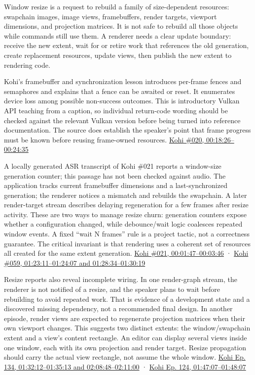 \hypertarget{06-engine-ii-ch041-resize-frames-in-flight-and-device-loss-evidence}{}

Window resize is a request to rebuild a family of size-dependent resources: swapchain images, image views, framebuffers, render targets, viewport dimensions, and projection matrices. It is not safe to rebuild all those objects while commands still use them. A renderer needs a clear update boundary: receive the new extent, wait for or retire work that references the old generation, create replacement resources, update views, then publish the new extent to rendering code.

Kohi's framebuffer and synchronization lesson introduces per-frame fences and semaphores and explains that a fence can be awaited or reset. It enumerates device loss among possible non-success outcomes. This is introductory Vulkan API teaching from a caption, so individual return-code wording should be checked against the relevant Vulkan version before being turned into reference documentation. The source does establish the speaker's point that frame progress must be known before reusing frame-owned resources. \href{https://www.youtube.com/watch?v=Is6CwlsaCFE&t=18m26s}{Kohi \#020, 00:18:26--00:24:35}

A locally generated ASR transcript of Kohi \#021 reports a window-size generation counter; this passage has not been checked against audio. The application tracks current framebuffer dimensions and a last-synchronized generation; the renderer notices a mismatch and rebuilds the swapchain. A later render-target stream describes delaying regeneration for a few frames after resize activity. These are two ways to manage resize churn: generation counters expose whether a configuration changed, while debounce/wait logic coalesces repeated window events. A fixed ``wait N frames'' rule is a project tactic, not a correctness guarantee. The critical invariant is that rendering uses a coherent set of resources all created for the same extent generation. \href{https://www.youtube.com/watch?v=hRL71D1f3pU&t=1m47s}{Kohi \#021, 00:01:47--00:03:46} · \href{https://www.youtube.com/watch?v=tZjc_hSaUA4&t=1h23m11s}{Kohi \#059, 01:23:11--01:24:07 and 01:28:34--01:30:19}

Resize reports also reveal incomplete wiring. In one render-graph stream, the renderer is not notified of a resize, and the speaker plans to wait before rebuilding to avoid repeated work. That is evidence of a development state and a discovered missing dependency, not a recommended final design. In another episode, render views are expected to regenerate projection matrices when their own viewport changes. This suggests two distinct extents: the window/swapchain extent and a view's content rectangle. An editor can display several views inside one window, each with its own projection and render target. Resize propagation should carry the actual view rectangle, not assume the whole window. \href{https://www.youtube.com/watch?v=AR6c1Bn57G4&t=1h32m12s}{Kohi Ep. 134, 01:32:12--01:35:13 and 02:08:48--02:11:00} · \href{https://www.youtube.com/watch?v=sCX_Sw0G4Ag&t=1h47m7s}{Kohi Ep. 124, 01:47:07--01:48:07}

